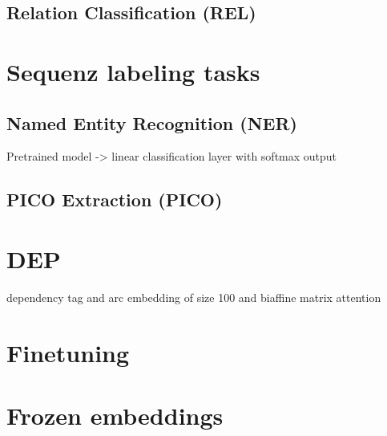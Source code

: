 \subsection{Relation Classification (REL)}
\section{Sequenz labeling tasks}
\subsection{Named Entity Recognition (NER)}
Pretrained model -> linear classification layer with softmax output
\subsection{PICO Extraction (PICO)}

\section{DEP}
dependency  tag and arc embedding of size 100 and biaffine matrix attention 
\section{Finetuning}
\section{Frozen embeddings}

